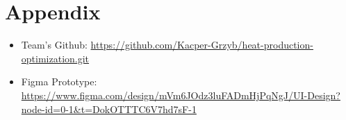 \documentclass[12pt]{report}
\begin{document}
\chapter*{Appendix}

\begin{itemize}
  \item Team's Github: \url{https://github.com/Kacper-Grzyb/heat-production-optimization.git}
  \item Figma Prototype: \url{https://www.figma.com/design/mVm6JOdz3luFADmHjPqNgJ/UI-Design?node-id=0-1&t=DokOTTTC6V7hd7sF-1}
\end{itemize}
\end{document}
